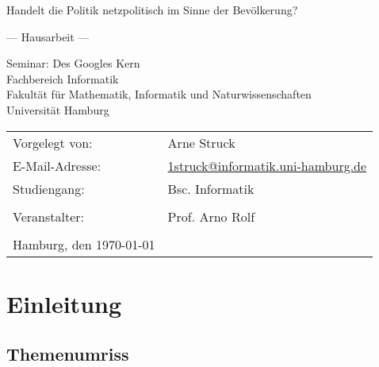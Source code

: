 \documentclass[
	12pt,
	a4paper,
	BCOR10mm,
	DIV14,
	listof=totoc,
	bibliography=totoc,
	headsepline
]{scrreprt}
\begin{document}
\begin{titlepage}
	\begin{center}
		{\titlefont\huge Handelt die Politik netzpolitisch im Sinne der Bevölkerung? \par}

		\bigskip
		\bigskip

		{\titlefont\Large --- Hausarbeit ---\par}

		\bigskip
		\bigskip

		{\large Seminar: Des Googles Kern\\
		Fachbereich Informatik\\
		Fakultät für Mathematik, Informatik und Naturwissenschaften\\
		Universität Hamburg\par}
	\end{center}

	\vfill

	{\large \begin{tabular}{ll}
		Vorgelegt von: & Arne Struck \\
		E-Mail-Adresse: 
			& \href{mailto:1struck@informatik.uni-hamburg.de}{1struck@informatik.uni-hamburg.de} \\ 
		Studiengang: & Bsc. Informatik \\
		\\
		Veranstalter: & Prof. Arno Rolf\\
		\\
		Hamburg, den \today
	\end{tabular}\par}
\end{titlepage}

\thispagestyle{empty}

\newpage\null\thispagestyle{empty}\newpage
\tableofcontents
\newpage\null\thispagestyle{empty}\newpage

\chapter{Einleitung}
\label{intro}

\section{Themenumriss}
\label{themeintro}
\end{document}
